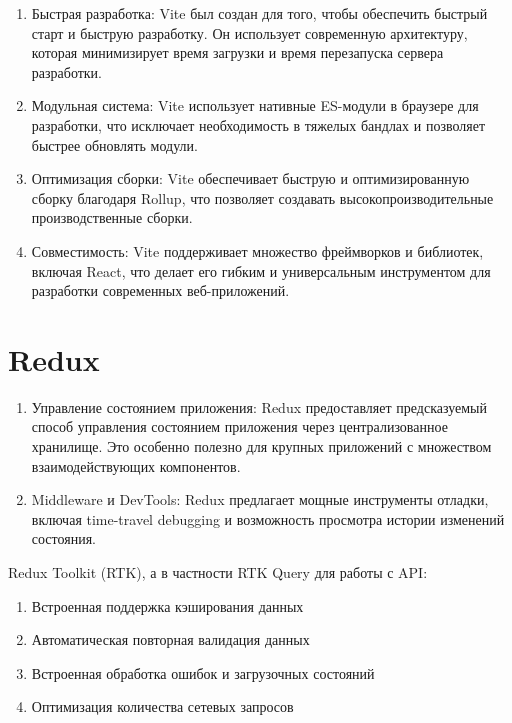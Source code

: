 \begin{enumerate}
    \item Быстрая разработка: Vite был создан для того, чтобы обеспечить быстрый старт и быструю разработку.
    Он использует современную архитектуру, которая минимизирует время загрузки и время перезапуска сервера разработки.


    \item Модульная система: Vite использует нативные ES-модули в браузере для разработки, что исключает необходимость в тяжелых бандлах и позволяет быстрее обновлять модули.

    \item Оптимизация сборки: Vite обеспечивает быструю и оптимизированную сборку благодаря Rollup, что позволяет создавать высокопроизводительные производственные сборки.

    \item Совместимость: Vite поддерживает множество фреймворков и библиотек, включая React, что делает его гибким и универсальным инструментом для разработки современных веб-приложений.

\end{enumerate}


\section{Redux}\label{sec:redux}

\begin{enumerate}
    \item Управление состоянием приложения: Redux предоставляет предсказуемый способ управления состоянием приложения через централизованное хранилище.
    Это особенно полезно для крупных приложений с множеством взаимодействующих компонентов.

    \item Middleware и DevTools: Redux предлагает мощные инструменты отладки, включая time-travel debugging и возможность просмотра истории изменений состояния.

\end{enumerate}


Redux Toolkit (RTK), а в частности RTK Query для работы с API:
\begin{enumerate}
    \item Встроенная поддержка кэширования данных

    \item Автоматическая повторная валидация данных

    \item Встроенная обработка ошибок и загрузочных состояний

    \item Оптимизация количества сетевых запросов
\end{enumerate}


